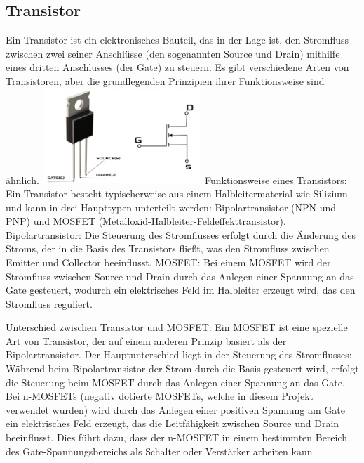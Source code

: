 \subsection{Transistor}
Ein Transistor ist ein elektronisches Bauteil, das in der Lage ist, den Stromfluss zwischen zwei seiner Anschlüsse
(den sogenannten Source und Drain) mithilfe eines dritten Anschlusses (der Gate) zu steuern. Es gibt verschiedene Arten
von Transistoren, aber die grundlegenden Prinzipien ihrer Funktionsweise sind ähnlich.\newline
\includegraphics[width=0.45\textwidth]{img/Mosfet} \newline
Funktionsweise eines Transistors:
Ein Transistor besteht typischerweise aus einem Halbleitermaterial wie Silizium und kann in drei Haupttypen unterteilt
werden: Bipolartransistor (NPN und PNP) und MOSFET (Metalloxid-Halbleiter-Feldeffekttransistor).  \newline
Bipolartransistor: Die Steuerung des Stromflusses erfolgt durch die Änderung des Stroms, der in die Basis des
Transistors fließt, was den Stromfluss zwischen Emitter und Collector beeinflusst. \newline
MOSFET: Bei einem MOSFET wird der Stromfluss zwischen Source und Drain durch das Anlegen einer Spannung an das Gate
gesteuert, wodurch ein elektrisches Feld im Halbleiter erzeugt wird, das den Stromfluss reguliert. \newline

Unterschied zwischen Transistor und MOSFET: \newline
Ein MOSFET ist eine spezielle Art von Transistor, der auf einem anderen Prinzip basiert als der Bipolartransistor. Der
Hauptunterschied liegt in der Steuerung des Stromflusses: Während beim Bipolartransistor der Strom durch die Basis
gesteuert wird, erfolgt die Steuerung beim MOSFET durch das Anlegen einer Spannung an das Gate.
Bei n-MOSFETs (negativ dotierte MOSFETs, welche in diesem Projekt verwendet wurden) wird durch das Anlegen einer
positiven Spannung am Gate ein
elektrisches Feld erzeugt, das die Leitfähigkeit zwischen Source und Drain beeinflusst. Dies führt dazu, dass der n-MOSFET
in einem bestimmten Bereich des Gate-Spannungsbereichs als Schalter oder Verstärker arbeiten kann. \newline

